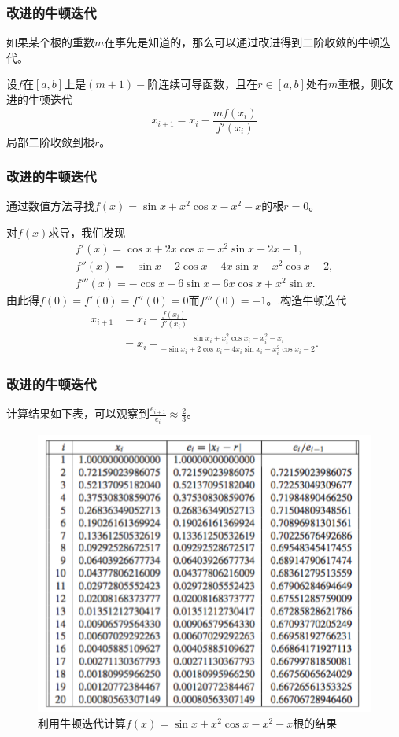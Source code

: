 \documentclass[10pt]{beamer}
\begin{document}
\begin{frame}
\frametitle{改进的牛顿迭代}
如果某个根的重数$m$在事先是知道的，那么可以通过改进得到二阶收敛的牛顿迭代。

\begin{theorem}[改进的牛顿迭代的二阶收敛性]
设$f$在$[a,b]$上是$(m+1)-$阶连续可导函数，且在$r \in [a,b]$处有$m$重根，则改进的牛顿迭代\begin{equation}
x_{i+1} = x_i - \frac{m f(x_i)}{f'(x_i)}
\end{equation}
局部二阶收敛到根$r$。
\end{theorem}
\end{frame}


\begin{frame}
\frametitle{改进的牛顿迭代}
\begin{example}
通过数值方法寻找$f(x) = \sin x + x^2 \cos x - x^2 -x$的根$r = 0$。
\end{example}
对$f(x)$求导，我们发现
\begin{align}
f'(x) = \cos x + 2x \cos x - x^2 \sin x - 2x -1, \nonumber \\
f''(x) = -\sin x + 2 \cos x - 4x \sin x - x^2 \cos x -2, \nonumber \\
f'''(x) = -\cos x - 6 \sin x - 6x \cos x + x^2 \sin x.
\end{align}
由此得$f(0) = f'(0) = f''(0) =0$而$f'''(0) = -1$。.构造牛顿迭代
\begin{align}
x_{i+1} & = x_i - \frac{f(x_i)}{f'(x_i)} \nonumber \\
            & = x_i - \frac{\sin x_i + x_i^2 \cos x_i - x_i^2 -x_i}{-\sin x_i + 2 \cos x_i - 4x_i \sin x_i - x_i^2 \cos x_i -2}.
\end{align}
\end{frame}

\begin{frame}
\frametitle{改进的牛顿迭代}
计算结果如下表，可以观察到$\frac{e_{i+1}}{e_{i}} \approx \frac{2}{3}$。
\begin{figure}
\includegraphics[width=6 cm]{figs/Newton_Ex_3_Results-1.png} 
\caption{利用牛顿迭代计算$f(x) = \sin x + x^2 \cos x - x^2 -x$根的结果} 
\end{figure}
\end{frame}
\end{document}
